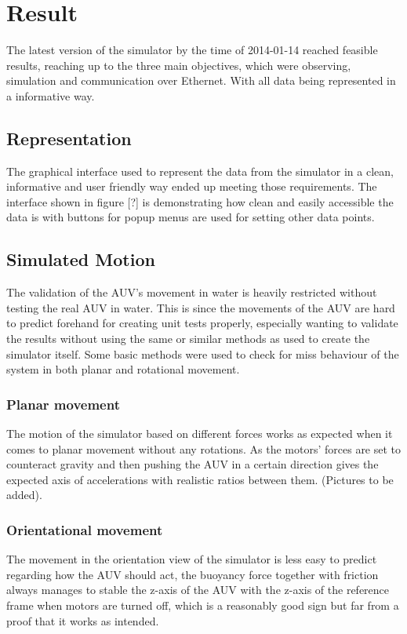 \section{Result}\label{sec:result}

The latest version of the simulator by the time of 2014-01-14 reached feasible results, reaching up to the three main objectives, which were observing, simulation and communication over Ethernet. With all data being represented in a informative way. 

\subsection{Representation}
The graphical interface used to represent the data from the simulator in a clean, informative and user friendly way ended up meeting those requirements. The interface shown in figure [?] is demonstrating how clean and easily accessible the data is with buttons for popup menus are used for setting other data points.

\subsection{Simulated Motion}
The validation of the AUV's movement in water is heavily restricted without testing the real AUV in water. This is since the movements of the AUV are hard to predict forehand for creating unit tests properly, especially wanting to validate the results without using the same or similar methods as used to create the simulator itself. Some basic methods were used to check for miss behaviour of the system in both planar and rotational movement.
\subsubsection{Planar movement}
The motion of the simulator based on different forces works as expected when it comes to planar movement without any rotations. As the motors' forces are set to counteract gravity and then pushing the AUV in a certain direction gives the expected axis of accelerations with realistic ratios between them.  (Pictures to be added).
\subsubsection{Orientational movement}
The movement in the orientation view of the simulator is less easy to predict regarding how the AUV should act, the buoyancy force together with friction always manages to stable the z-axis of the AUV with the z-axis of the reference frame when motors are turned off, which is a reasonably good sign but far from a proof that it works as intended.

